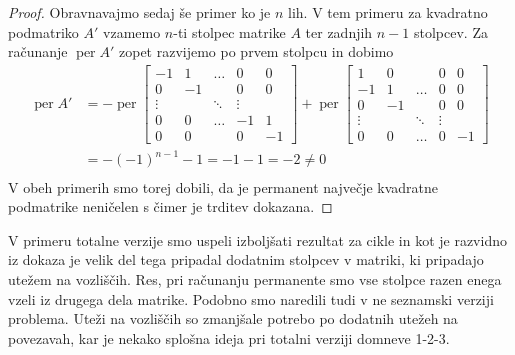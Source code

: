 \documentclass[12pt,a4paper,twoside]{article}
\theoremstyle{definition} %
\theoremstyle{plain} %
\numberwithin{equation}{section}  %
\DeclareMathOperator{\per}{per}
\begin{document}
\begin{proof}
Obravnavajmo sedaj še primer ko je $n$ lih. V tem primeru za kvadratno podmatriko $A'$ vzamemo $n$-ti stolpec matrike $A$ ter zadnjih $n-1$ stolpcev. Za računanje $\per A'$ zopet razvijemo po prvem stolpcu in dobimo
\begin{equation*}
\begin{split}
 \per A' &=-\per\left[
\begin{matrix} 
 -1 & 1 & \ldots & 0 & 0 \\ 
 0 & -1 &  & 0 & 0 \\ 
 \vdots &  & \ddots & \vdots &  \\ 
 0 & 0 & \ldots & -1 & 1 \\
 0 & 0 &  & 0 & -1 
\end{matrix} \right]
+\per\left[
\begin{matrix} 
 1 & 0 &  & 0 & 0 \\
 -1 & 1 & \ldots & 0 & 0 \\  0 & -1 &  & 0 & 0 \\ 
  \vdots &  & \ddots & \vdots &  \\ 
 0 & 0 & \ldots & 0 & -1
\end{matrix} \right] \\
&=-(-1)^{n-1} -1 =  -1 - 1 = -2 \neq 0\\
\end{split}
\end{equation*}
V obeh primerih smo torej dobili, da je permanent največje kvadratne podmatrike neničelen s čimer je trditev dokazana.
\end{proof}
V primeru totalne verzije smo uspeli izboljšati rezultat za cikle in kot je razvidno iz dokaza je velik del tega pripadal dodatnim stolpcev v matriki, ki pripadajo utežem na vozliščih. Res, pri računanju permanente smo vse stolpce razen enega vzeli iz drugega dela matrike. Podobno smo naredili tudi v ne seznamski verziji problema. Uteži na vozliščih so zmanjšale potrebo po dodatnih utežeh na povezavah, kar je nekako splošna ideja pri totalni verziji domneve 1-2-3.
\end{document}
